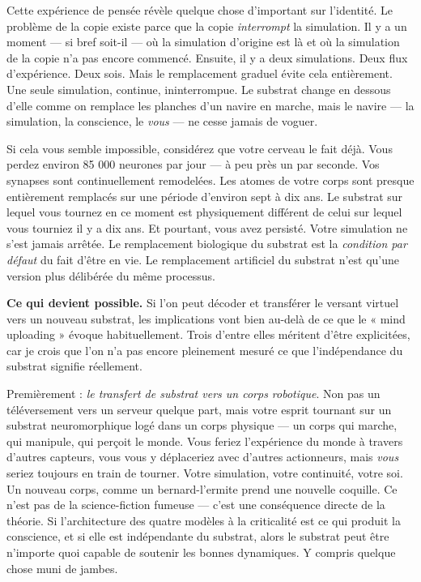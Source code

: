 \documentclass[11pt, twoside, openright]{book}
\begin{document}
Cette expérience de pensée révèle quelque chose d'important sur l'identité. Le problème de la copie existe parce que la copie \textit{interrompt} la simulation. Il y a un moment --- si bref soit-il --- où la simulation d'origine est là et où la simulation de la copie n'a pas encore commencé. Ensuite, il y a deux simulations. Deux flux d'expérience. Deux sois. Mais le remplacement graduel évite cela entièrement. Une seule simulation, continue, ininterrompue. Le substrat change en dessous d'elle comme on remplace les planches d'un navire en marche, mais le navire --- la simulation, la conscience, le \textit{vous} --- ne cesse jamais de voguer.

Si cela vous semble impossible, considérez que votre cerveau le fait déjà. Vous perdez environ 85 000 neurones par jour --- à peu près un par seconde. Vos synapses sont continuellement remodelées. Les atomes de votre corps sont presque entièrement remplacés sur une période d'environ sept à dix ans. Le substrat sur lequel vous tournez en ce moment est physiquement différent de celui sur lequel vous tourniez il y a dix ans. Et pourtant, vous avez persisté. Votre simulation ne s'est jamais arrêtée. Le remplacement biologique du substrat est la \textit{condition par défaut} du fait d'être en vie. Le remplacement artificiel du substrat n'est qu'une version plus délibérée du même processus.

\textbf{Ce qui devient possible.} Si l'on peut décoder et transférer le versant virtuel vers un nouveau substrat, les implications vont bien au-delà de ce que le « mind uploading » évoque habituellement. Trois d'entre elles méritent d'être explicitées, car je crois que l'on n'a pas encore pleinement mesuré ce que l'indépendance du substrat signifie réellement.

Premièrement : \textit{le transfert de substrat vers un corps robotique}. Non pas un téléversement vers un serveur quelque part, mais votre esprit tournant sur un substrat neuromorphique logé dans un corps physique --- un corps qui marche, qui manipule, qui perçoit le monde. Vous feriez l'expérience du monde à travers d'autres capteurs, vous vous y déplaceriez avec d'autres actionneurs, mais \textit{vous} seriez toujours en train de tourner. Votre simulation, votre continuité, votre soi. Un nouveau corps, comme un bernard-l'ermite prend une nouvelle coquille. Ce n'est pas de la science-fiction fumeuse --- c'est une conséquence directe de la théorie. Si l'architecture des quatre modèles à la criticalité est ce qui produit la conscience, et si elle est indépendante du substrat, alors le substrat peut être n'importe quoi capable de soutenir les bonnes dynamiques. Y compris quelque chose muni de jambes.
\end{document}
